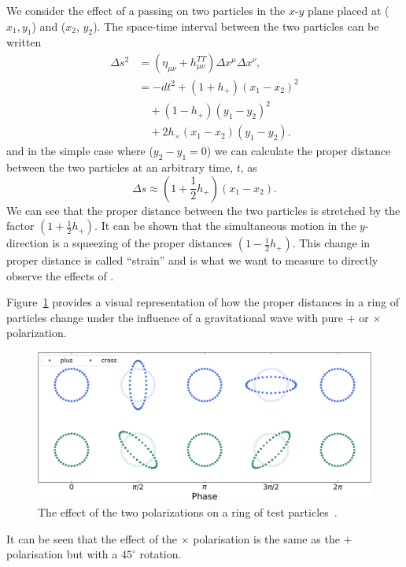 We consider the effect of a passing \gw on two particles in the $x$-$y$ plane placed at ($x_{1}, y_{1}$) and ($x_{2}$, $y_{2}$). The space-time interval between the two particles can be written
%
\begin{align}
    \Delta s^{2} &= \left(\eta_{\mu\nu} + h^{TT}_{\mu\nu}\right) \Delta x^{\mu} \Delta x^{\nu}, \\
    &= -dt^{2} + \left(1 + h_{+}\right)(x_{1} - x_{2})^{2} \nonumber \\
    &\quad + \left(1 - h_{+}\right)(y_{1} - y_{2})^{2} \nonumber \\
    &\quad + 2h_{\times} (x_{1} - x_{2})(y_{1} - y_{2}).
\end{align}
%
and in the simple case where ($y_{2} - y_{1} = 0$) we can calculate the proper distance between the two particles at an arbitrary time, $t$, as
%
\begin{equation}
    \Delta s \approx \left( 1 + \frac{1}{2} h_{+}\right)(x_{1} - x_{2}).
    \label{1:eq:proper_dist_two_particles}
\end{equation}
%
We can see that the proper distance between the two particles is stretched by the factor $(1 + \frac{1}{2}h_{+})$. It can be shown that the simultaneous motion in the $y$-direction is a squeezing of the proper distances $(1 - \frac{1}{2}h_{+})$. This change in proper distance is called \gwadj ``strain'' and is what we want to measure to directly observe the effects of \gws.

Figure~\ref{1:fig:ring_of_particles} provides a visual representation of how the proper distances in a ring of particles change under the influence of a gravitational wave with pure $+$ or $\times$ polarization.
%
\begin{figure}
   \includegraphics[width=\textwidth]{images/1_general_relativity/polarization.png}
   \caption{The effect of the two polarizations on a ring of test particles~\cite{gw_polarization_plots}.}
   \label{1:fig:ring_of_particles}
\end{figure}
%
It can be seen that the effect of the $\times$ polarisation is the same as the $+$ polarisation but with a $45^{\circ}$ rotation.

